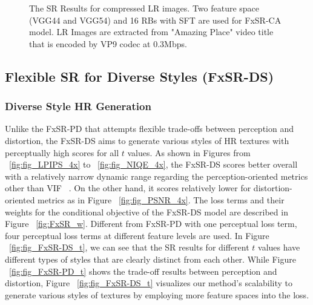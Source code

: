 \documentclass{article}
\begin{document}
\begin{figure*}[!t]
\centering
{}
\caption{The SR Results for compressed LR images. Two feature space (VGG44 and VGG54) and 16 RBs with SFT are used for FxSR-CA model. LR Images are extracted from "Amazing Place" video title that is encoded by VP9 codec at 0.3Mbps.}
\label{fig:FxSR-CA}
\end{figure*}

\subsection{Flexible SR for Diverse Styles (FxSR-DS)}
\subsubsection{Diverse Style HR Generation}
Unlike the FxSR-PD that attempts flexible trade-offs between perception and distortion, the FxSR-DS aims to generate various styles of HR textures with perceptually high scores for all $t$ values. As shown in Figures from ~\ref{fig:fig_LPIPS_4x} to ~\ref{fig:fig_NIQE_4x}, the FxSR-DS scores better overall with a relatively narrow dynamic range regarding the perception-oriented metrics other than VIF ~\cite{sheikh2006image}. On the other hand, it scores relatively lower for distortion-oriented metrics as in Figure ~\ref{fig:fig_PSNR_4x}. The loss terms and their weights for the conditional objective of the FxSR-DS model are described in Figure ~\ref{fig:FxSR_w}. Different from FxSR-PD with one perceptual loss term, four perceptual loss terms at different feature levels are used. In Figure ~\ref{fig:fig_FxSR-DS_t}, we can see that the SR results for different $t$ values have different types of styles that are clearly distinct from each other. While Figure ~\ref{fig:fig_FxSR-PD_t} shows the trade-off results between perception and distortion, Figure ~\ref{fig:fig_FxSR-DS_t} visualizes our method's scalability to generate various styles of textures by employing more feature spaces into the loss. 
\end{document}
